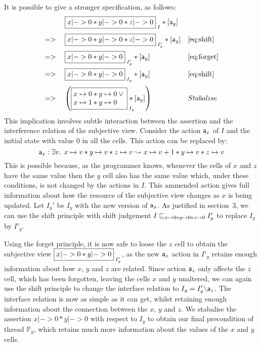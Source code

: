 It is possible to give a  stronger specification, as follows: 
\[
\begin{array}{lll}
 & \shared{x|-> 0 * y|->0 * z|-> 0}{I} *[\token a_y]&\\[1em]
=> & \shared{x|-> 0 * y|->0 * z|-> 0}{I'_y} *[\token a_y ]&\eqref{eq:shift}\\[1em]
 => & \shared{x|-> 0 * y|->0 }{I'_y} *[\token a_y]
 &\eqref{eq:forget}\\[1em]
=> & \shared{x|-> 0 * y|->0 }{I_y} *[\token a_y]
 &\eqref{eq:shift}\\[1em]
 =>\null&
    \left(\shared{\begin{array}{@{}l<{\null}@{}l<{\null}@{}}\cell{x}{0} *
        \cell{y}{0} \lor\\ \cell{x}{1} *
        \cell{y}{0}\end{array}}{I_y}\!\!\!\!\!\! * [\token a_y]\right) &
  Stabalise
\end{array}
\]
This implication involves subtle interaction between the assertion and
the interference relation of the subjective view. 
Consider the action 
$\mathsf{a}_x$ 
of $I$ and the initial state with value $0$ in all the cells. This
action can be replaced by:
\[
\mathsf{a}_x : \exists v.\, \; 
x \mapsto v * y \mapsto v * z \mapsto v
\mathrel{\leadsto}
x \mapsto v+1 * y \mapsto v * z \mapsto v
\]
This is possible  because, as the programmer knows, whenever the cells
of $x$ and
$z$ have the same value then the $y$ cell also has the same value which, under these
conditions, is not changed by the actions in $I$. This ammended action  gives full information about how the resource of
the subjective view changes as $x$ is being updated. 
  Let  $I_y' $ be  $I_y$ with the new version of $\mathsf{a}_x$.
As  justified in section~3, we can 
use  the shift principle with  shift judgement 
$
I\sqsubseteq_{x \mapsto 0 * y \mapsto 0 * z \mapsto 0} I_y'
$
to replace $I_y$ by $I'_y$. 





Using the forget principle,  it is now safe to loose the $z$ cell to
obtain the subjective view  $\shared{x|-> 0 * y|->0 }{I'_y}$,  as 
the new $\mathsf{a}_x$ action in $I'_y$ retains enough information about how
$x$, $y$ and $z$ are related.
Since action $\mathsf{a}_z$ only affects the $z$ cell, which has been
forgotten, leaving  the cells $x$ and $y$ unaltered, we can again use the
shift principle to change  the interface
relation to $I_y = I'_y \backslash \mathsf{a}_z$. The interface relation
is now as simple as it can get, whilst retaining enough information
about the 
connection between the $x$, $y$ and $z$. We   stabalise
the 
assertion $x|-> 0 * y|->0$ with respect to $I_y$ to obtain our final
precondition of thread $\mathbb{P}_y$, which retains much more
information about the values of the $x$ and $y$ cells. 







